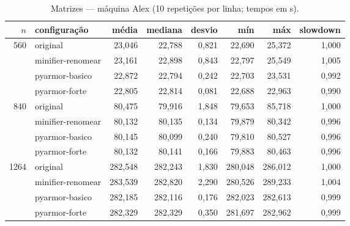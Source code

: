 \begin{table}[ht]\centering\footnotesize
\caption{Matrizes --- máquina Alex (10 repetições por linha; tempos em s).}\label{tab:alex-matrizes}
\begin{tabular}{rlrrrrrr}\hline
$n$ & configuração & média & mediana & desvio & mín & máx & slowdown \\\hline
560 & original & 23,046 & 22,788 & 0,821 & 22,690 & 25,372 & 1,000 \\
 & minifier-renomear & 23,161 & 22,898 & 0,843 & 22,797 & 25,549 & 1,005 \\
 & pyarmor-basico & 22,872 & 22,794 & 0,242 & 22,703 & 23,531 & 0,992 \\
 & pyarmor-forte & 22,805 & 22,814 & 0,081 & 22,688 & 22,963 & 0,990 \\
\hline
840 & original & 80,475 & 79,916 & 1,848 & 79,653 & 85,718 & 1,000 \\
 & minifier-renomear & 80,132 & 80,135 & 0,134 & 79,879 & 80,342 & 0,996 \\
 & pyarmor-basico & 80,145 & 80,099 & 0,240 & 79,810 & 80,527 & 0,996 \\
 & pyarmor-forte & 80,132 & 80,141 & 0,166 & 79,883 & 80,463 & 0,996 \\
\hline
1264 & original & 282,548 & 282,243 & 1,830 & 280,048 & 286,012 & 1,000 \\
 & minifier-renomear & 283,539 & 282,820 & 2,290 & 280,526 & 289,233 & 1,004 \\
 & pyarmor-basico & 282,185 & 282,116 & 0,176 & 282,023 & 282,613 & 0,999 \\
 & pyarmor-forte & 282,329 & 282,329 & 0,350 & 281,697 & 282,962 & 0,999 \\
\hline
\end{tabular}\end{table}


